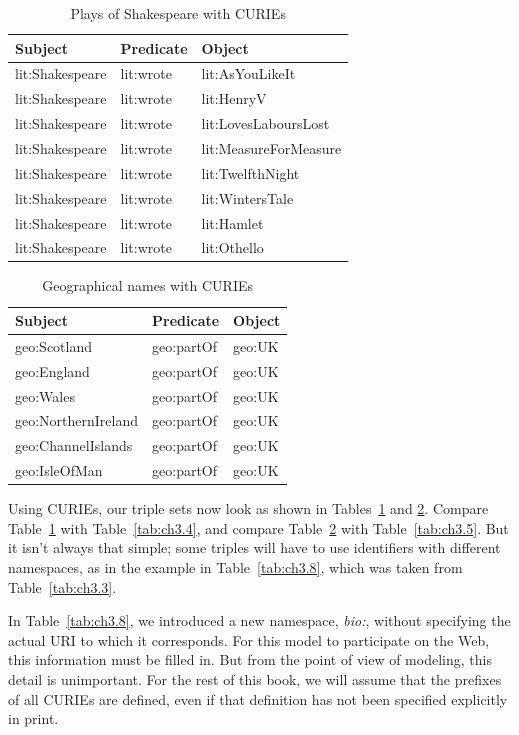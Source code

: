 \begin{table}[h]
\centering
\begin{tabular}{||l l l ||} 
 \hline
 Subject&Predicate&Object \\ [0.5ex] 
 \hline\hline
lit:Shakespeare&lit:wrote&lit:AsYouLikeIt\\
lit:Shakespeare&lit:wrote&lit:HenryV\\
lit:Shakespeare&lit:wrote&lit:LovesLaboursLost\\
lit:Shakespeare&lit:wrote&lit:MeasureForMeasure\\
lit:Shakespeare&lit:wrote&lit:TwelfthNight\\
lit:Shakespeare&lit:wrote&lit:WintersTale\\
lit:Shakespeare&lit:wrote&lit:Hamlet\\
lit:Shakespeare&lit:wrote&lit:Othello\\
\hline
\end{tabular}
\caption{Plays of Shakespeare with CURIEs}
\label{tab:ch3.6}
\end{table}



\begin{table}[h]
\centering
\begin{tabular}{||l l l ||} 
 \hline
 Subject&Predicate&Object \\ [0.5ex] 
 \hline\hline
geo:Scotland&geo:partOf&geo:UK \\
geo:England&geo:partOf&geo:UK \\
geo:Wales&geo:partOf&geo:UK \\
geo:NorthernIreland&geo:partOf&geo:UK \\
geo:ChannelIslands&geo:partOf&geo:UK \\
geo:IsleOfMan&geo:partOf&geo:UK \\
\hline
\end{tabular}
\caption{Geographical names with CURIEs}
\label{tab:ch3.7}
\end{table}

Using CURIEs, our triple sets now look as shown in Tables~\ref{tab:ch3.6} and \ref{tab:ch3.7}.
Compare Table~\ref{tab:ch3.6} with Table~\ref{tab:ch3.4}, and compare Table~\ref{tab:ch3.7} with Table~\ref{tab:ch3.5}.
But it isn't always that simple; some triples will have to use
identifiers with different namespaces, as in the example in Table~\ref{tab:ch3.8},
which was taken from Table~\ref{tab:ch3.3}.

In Table~\ref{tab:ch3.8}, we introduced a new namespace, \emph{bio:}, without
specifying the actual URI to which it corresponds. For this model to
participate on the Web, this information must be filled in. But from the
point of view of modeling, this detail is unimportant. For the rest of
this book, we will assume that the prefixes of all CURIEs are defined,
even if that definition has not been specified explicitly in print.

